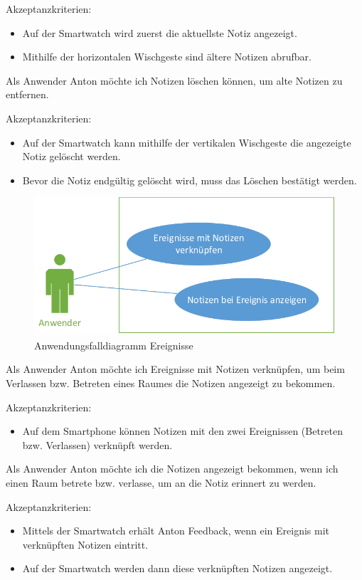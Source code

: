 Akzeptanzkriterien:
\begin{itemize}
\item Auf der Smartwatch wird zuerst die aktuellste Notiz angezeigt.
\item Mithilfe der horizontalen Wischgeste sind ältere Notizen abrufbar.
\end{itemize}

Als Anwender Anton möchte ich Notizen löschen können, um alte Notizen zu entfernen.

Akzeptanzkriterien:
\begin{itemize}
\item Auf der Smartwatch kann mithilfe der vertikalen Wischgeste die angezeigte Notiz gelöscht werden.
\item Bevor die Notiz endgültig gelöscht wird, muss das Löschen bestätigt werden.
\end{itemize}


\begin{figure}[H]
\centering
\includegraphics[width=0.7\linewidth]{Bilder/UseCase-Ereignisse}
\caption{Anwendungsfalldiagramm Ereignisse}
\label{fig:UseCase-Ereignisse}
\end{figure}

Als Anwender Anton möchte ich Ereignisse mit Notizen verknüpfen, um beim Verlassen bzw. Betreten eines Raumes die Notizen angezeigt zu bekommen.

Akzeptanzkriterien:
\begin{itemize}
\item Auf dem Smartphone können Notizen mit den zwei Ereignissen (Betreten bzw. Verlassen) verknüpft werden.
\end{itemize}

Als Anwender Anton möchte ich die Notizen angezeigt bekommen, wenn ich einen Raum betrete bzw. verlasse, um an die Notiz erinnert zu werden.

Akzeptanzkriterien:
\begin{itemize}
\item Mittels der Smartwatch erhält Anton Feedback, wenn ein Ereignis mit verknüpften Notizen eintritt.
\item Auf der Smartwatch werden dann diese verknüpften Notizen angezeigt.
\end{itemize}


